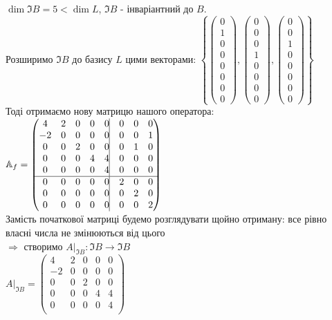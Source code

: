 \documentclass[a4paper, 10pt]{article}
\theoremstyle{theoremdd}
\begin{document}
$\dim \Im B = 5 < \dim L$, $\Im B$ - інваріантний до $B$.\\
Розширимо $\Im B$ до базису $L$ цими векторами: $\left\{ \begin{pmatrix} 0 \\ 1 \\ 0 \\ 0 \\ 0 \\ 0 \\ 0 \\ 0 \end{pmatrix}, \begin{pmatrix} 0 \\ 0 \\ 0 \\ 1 \\ 0 \\ 0 \\ 0 \\ 0 \end{pmatrix}, \begin{pmatrix} 0 \\ 0 \\ 1 \\ 0 \\ 0 \\ 0 \\ 0 \\ 0 \end{pmatrix} \right\}$\\
Тоді отримаємо нову матрицю нашого оператора:\\
$\mathbb{A}_f = \begin{pmatrix}
4 & 2 & 0 & 0 & 0 \vline & 0 & 0 & 0\\
-2 & 0 & 0 & 0 & 0 \vline & 0 & 0 & 1 \\
0 & 0 & 2 & 0 & 0 \vline & 0 & 1 & 0 \\
0 & 0 & 0 & 4 & 4 \vline & 0 & 0 & 0\\
0 & 0 & 0 & 0 & 4 \vline & 0 & 0 & 0\\
\hline
0 & 0 & 0 & 0 & 0 \vline & 2 & 0 & 0\\
0 & 0 & 0 & 0 & 0 \vline & 0 & 2 & 0 \\
0 & 0 & 0 & 0 & 0 \vline & 0 & 0 & 2\\
\end{pmatrix}$\\
Замість початкової матриці будемо розглядувати щойно отриману: все рівно власні числа не змінюються від цього\\
$\Rightarrow$ створимо $A|_{\Im B}: \Im B \to \Im B$\\
$A|_{\Im B} = \begin{pmatrix}
4 & 2 & 0 & 0 & 0 \\
-2 & 0 & 0 & 0 & 0 \\
0 & 0 & 2 & 0 & 0 \\
0 & 0 & 0 & 4 & 4 \\
0 & 0 & 0 & 0 & 4 \\
\end{pmatrix}$
\newpage
\end{document}
